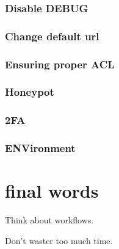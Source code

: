 \documentclass[letterpaper,12pt,english]{sphinxmanual}
\begin{document}
\subsection{Disable DEBUG}
\label{\detokenize{admin_secure:disable-debug}}

\subsection{Change default url}
\label{\detokenize{admin_secure:change-default-url}}

\subsection{Ensuring proper ACL}
\label{\detokenize{admin_secure:ensuring-proper-acl}}

\subsection{Honeypot}
\label{\detokenize{admin_secure:honeypot}}


\subsection{2FA}
\label{\detokenize{admin_secure:fa}}


\subsection{ENVironment}
\label{\detokenize{admin_secure:environment}}


\chapter{final words}
\label{\detokenize{final:final-words}}\label{\detokenize{final::doc}}
Think about workflows.

Don’t waster too much time.



\renewcommand{\indexname}{Index}
\printindex
\end{document}
